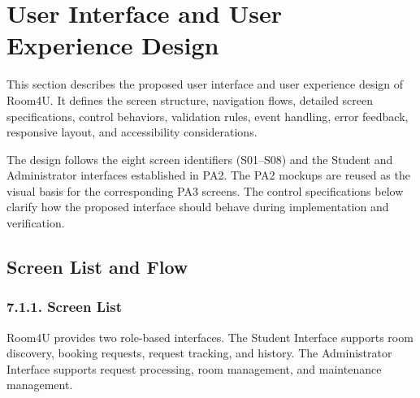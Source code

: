 \providecommand{\tightlist}{%
  \setlength{\itemsep}{0pt}\setlength{\parskip}{0pt}}
\providecommand{\maxwidth}{\linewidth}
\providecommand{\maxheight}{\textheight}



\section{User Interface and User Experience Design}\label{user-interface-and-user-experience-design}

This section describes the proposed user interface and user experience
design of Room4U. It defines the screen structure, navigation flows,
detailed screen specifications, control behaviors, validation rules,
event handling, error feedback, responsive layout, and accessibility
considerations.

The design follows the eight screen identifiers (S01--S08) and the
Student and Administrator interfaces established in PA2. The PA2 mockups
are reused as the visual basis for the corresponding PA3 screens. The
control specifications below clarify how the proposed interface should
behave during implementation and verification.

\subsection{Screen List and Flow}\label{screen-list-and-flow}

\subsubsection{7.1.1. Screen List}\label{screen-list}

Room4U provides two role-based interfaces. The Student Interface
supports room discovery, booking requests, request tracking, and
history. The Administrator Interface supports request processing, room
management, and maintenance management.

